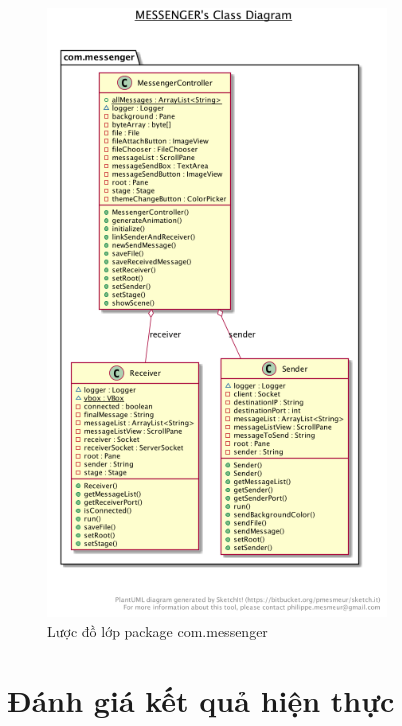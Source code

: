 \documentclass[a4paper]{article}
\begin{document}
\begin{itemize}
\begin{figure}[h!]
		\includegraphics[width=9cm]{plantuml-messenger}
		\caption{Lược đồ lớp package com.messenger}
	\end{figure}
\end{itemize}

\newpage
\section{Đánh giá kết quả hiện thực}
\end{document}
